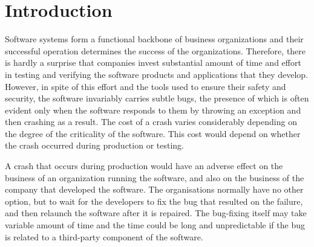 \section{Introduction}
\label{sec:intro}


Software systems form a functional backbone of business organizations and their
successful operation determines
the success of the organizations. Therefore, there is hardly a surprise that
companies
invest substantial amount of time and effort in testing and verifying the
software products and applications
that they develop. However, in spite of this effort and the tools used to
ensure their safety and security, the software invariably carries subtle bugs,
the presence of
which is often evident only when the software responds to them by throwing an
exception and then crashing as a result. The cost of a crash varies considerably
depending on the degree
of the criticality of the software. This cost would depend on whether the crash 
occurred during production or testing.


A crash that occurs during production would
have an adverse effect on the business of an organization running the software,
and also on the business
of the company that developed the software. The organisations normally have no
other option, but to wait for the
developers to fix the bug that resulted on the failure, and then relaunch the
software after it is repaired. The bug-fixing
itself may take variable amount of time and the time could be long and
unpredictable if the bug is related to a third-party
component of the software.


